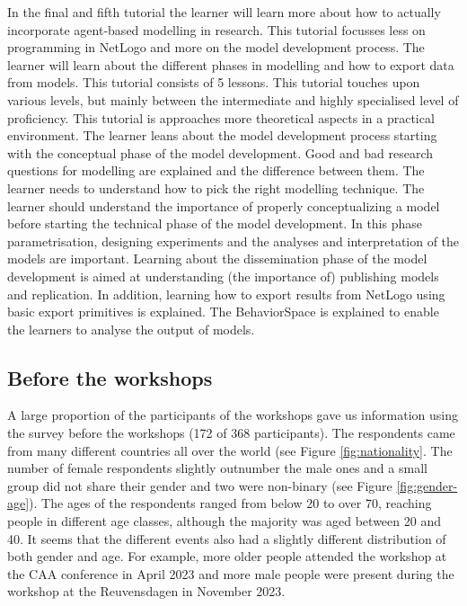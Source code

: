 \documentclass[
]{article}
\begin{document}
In the final and fifth tutorial the learner will learn more about how to actually incorporate agent-based modelling in research. This tutorial focusses less on programming in NetLogo and more on the model development process. The learner will learn about the different phases in modelling and how to export data from models. This tutorial consists of 5 lessons. This tutorial touches upon various levels, but mainly between the intermediate and highly specialised level of proficiency. This tutorial is approaches more theoretical aspects in a practical environment. The learner leans about the model development process starting with the conceptual phase of the model development. Good and bad research questions for modelling are explained and the difference between them. The learner needs to understand how to pick the right modelling technique. The learner should understand the importance of properly conceptualizing a model before starting the technical phase of the model development. In this phase parametrisation, designing experiments and the analyses and interpretation of the models are important. Learning about the dissemination phase of the model development is aimed at understanding (the importance of) publishing models and replication. In addition, learning how to export results from NetLogo using basic export primitives is explained. The BehaviorSpace is explained to enable the learners to analyse the output of models.

\hypertarget{before-the-workshops}{%
\subsection{Before the workshops}\label{before-the-workshops}}

A large proportion of the participants of the workshops gave us information using the survey before the workshops (172 of 368 participants). The respondents came from many different countries all over the world (see Figure \ref{fig:nationality}. The number of female respondents slightly outnumber the male ones and a small group did not share their gender and two were non-binary (see Figure \ref{fig:gender-age}). The ages of the respondents ranged from below 20 to over 70, reaching people in different age classes, although the majority was aged between 20 and 40. It seems that the different events also had a slightly different distribution of both gender and age. For example, more older people attended the workshop at the CAA conference in April 2023 and more male people were present during the workshop at the Reuvensdagen in November 2023.
\end{document}
